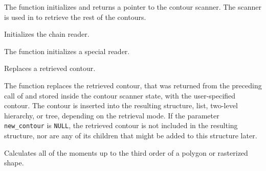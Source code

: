 \begin{description}
\end{description}

The function initializes and returns a pointer to the contour scanner. The scanner is used in  to retrieve the rest of the contours.

Initializes the chain reader.


The function initializes a special reader.

Replaces a retrieved contour.


\begin{description}
\end{description}

The function replaces the retrieved
contour, that was returned from the preceding call of
 and stored inside the contour scanner
state, with the user-specified contour. The contour is inserted
into the resulting structure, list, two-level hierarchy, or tree,
depending on the retrieval mode. If the parameter \texttt{new\_contour}
is \texttt{NULL}, the retrieved contour is not included in the
resulting structure, nor are any of its children that might be added
to this structure later.

\fi

\fi


\ifCpp

Calculates all of the moments up to the third order of a polygon or rasterized shape.

